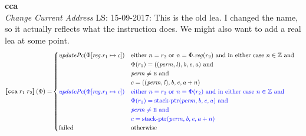 \documentclass[a4paper]{article}
\newcommand\lau[1]{{\color{purple} \sf \footnotesize {LS: #1}}\\}
\newcommand{\sem}[1]{\left\llbracket #1 \right\rrbracket}
\newcommand{\tand}{\text{ and }}
\newcommand{\totherwise}{\text{otherwise }}
\newcommand{\sourcecolor}[1]{\color{blue}}
\newcommand{\src}[1]{{\sourcecolor{} #1}}
\newcommand{\targetcolor}[1]{\color{black}}
\newcommand{\trg}[1]{{\targetcolor{} #1}}
\newcommand{\zinstr}[1]{\texttt{#1}}
\newcommand{\twoinstr}[3]{
  \ifthenelse{\equal{#2#3}{}}
  {\zinstr{#1}}
  {\zinstr{#1} \; #2 \; #3}
}
\newcommand{\tcca}[2]{\twoinstr{\trg{cca}}{#1}{#2}}
\newcommand{\ints}{\mathbb{Z}}
\newcommand{\update}[2]{[#1 \mapsto #2]}
\newcommand{\updReg}[2]{\update{\reg.#1}{#2}}
\newcommand{\perm}{\var{perm}}
\newcommand{\lin}{\var{l}}
\newcommand{\stkptr}[1]{\mathrm{stack\text{-}ptr}(#1)}
\newcommand{\failed}{\mathrm{failed}}
\newcommand{\var}[1]{\mathit{#1}}
\newcommand{\reg}{\var{reg}}
\newcommand{\baddr}{\var{b}}
\newcommand{\eaddr}{\var{e}}
\newcommand{\aaddr}{\var{a}}
\newcommand{\plainperm}[1]{\textsc{#1}}
\newcommand{\enter}{\plainperm{e}}
\newcommand{\plainfun}[2]{
  \ifthenelse{\equal{#2}{}}
  {\mathit{#1}}
  {\mathit{#1}(#2)}
}
\newcommand{\updPcAddr}[1]{\plainfun{updatePc}{#1}}
\begin{document}
\noindent\textbf{cca}\\
\emph{Change Current Address}
\lau{15-09-2017: This is the old lea. I changed the name, so it actually reflects what the instruction does. We might also want to add a real lea at some point.}
\begin{align*}
  \sem{\tcca{r_1}{r_2}}(\Phi) = & 
                                  \begin{cases}
                                    \updPcAddr{\Phi\updReg{r_1}{c}} &  
                                    \arraycolsep=0pt
                                    \begin{array}[t]{l}
                                      \text{either $n = r_2$ or $n = \Phi.\reg(r_2)$ and in either case $n \in \ints$ and} \\
                                      \Phi(r_1) = ((\perm,\lin),\baddr,\eaddr,\aaddr) \tand \\
                                      \perm \neq \enter \tand \\
                                      c = ((\perm,\lin),\baddr,\eaddr,\aaddr + n)
                                    \end{array}
                                    \\
                                    \src{\updPcAddr{\Phi\updReg{r_1}{c}}} &  
                                    \arraycolsep=0pt
                                    \begin{array}[t]{l}
                                      \src{\text{either $n = r_2$ or $n = \Phi(r_2)$ and in either case $n \in \ints$ and}} \\
                                      \src{\Phi(r_1) = \stkptr{\perm,\baddr,\eaddr,\aaddr} \tand} \\
                                      \src{\perm \neq \enter \tand} \\
                                      \src{c = \stkptr{\perm,\baddr,\eaddr,\aaddr + n}}
                                    \end{array}
                                    \\
                                    \failed & \totherwise
                                  \end{cases}
\end{align*}
\end{document}

